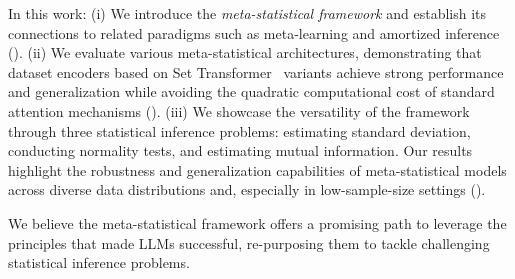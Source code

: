 
In this work: 
(i) We introduce the \textit{meta-statistical framework} and establish its connections to related paradigms such as meta-learning and amortized inference ().
(ii) We evaluate various meta-statistical architectures, demonstrating that dataset encoders based on Set Transformer~\cite{lee2019set} variants achieve strong performance and generalization while avoiding the quadratic computational cost of standard attention mechanisms ().
(iii) We showcase the versatility of the framework through three statistical inference problems: estimating standard deviation, conducting normality tests, and estimating mutual information. Our results highlight the robustness and generalization capabilities of meta-statistical models across diverse data distributions and, especially in low-sample-size settings ().

We believe the meta-statistical framework offers a promising path to leverage the principles that made LLMs successful, re-purposing them to tackle challenging statistical inference problems. 










